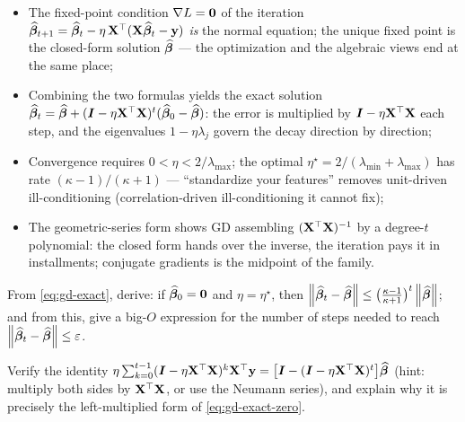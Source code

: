 \begin{keybox}
\begin{itemize}
  \item The fixed-point condition $\nabla L = \mathbf{0}$ of the iteration $\widehat{\bm{\beta}}_{t+1} = \widehat{\bm{\beta}}_t - \eta\,\mathbf{X}^\top(\mathbf{X}\widehat{\bm{\beta}}_t - \mathbf{y})$ \emph{is} the normal equation; the unique fixed point is the closed-form solution $\widehat{\bm{\beta}}$ — the optimization and the algebraic views end at the same place;
  \item Combining the two formulas yields the exact solution $\widehat{\bm{\beta}}_t = \widehat{\bm{\beta}} + (\bm{I} - \eta\mathbf{X}^\top\mathbf{X})^t(\widehat{\bm{\beta}}_0 - \widehat{\bm{\beta}})$: the error is multiplied by $\bm{I} - \eta\mathbf{X}^\top\mathbf{X}$ each step, and the eigenvalues $1 - \eta\lambda_j$ govern the decay direction by direction;
  \item Convergence requires $0 < \eta < 2/\lambda_{\max}$; the optimal $\eta^\star = 2/(\lambda_{\min} + \lambda_{\max})$ has rate $(\kappa - 1)/(\kappa + 1)$ — ``standardize your features'' removes unit-driven ill-conditioning (correlation-driven ill-conditioning it cannot fix);
  \item The geometric-series form shows GD assembling $(\mathbf{X}^\top\mathbf{X})^{-1}$ by a degree-$t$ polynomial: the closed form hands over the inverse, the iteration pays it in installments; conjugate gradients is the midpoint of the family.
\end{itemize}
\end{keybox}

\begin{exercise}\label{ex:gd-rate}
From \eqref{eq:gd-exact}, derive: if $\widehat{\bm{\beta}}_0 = \mathbf{0}$ and $\eta = \eta^\star$, then $\left\lVert \widehat{\bm{\beta}}_t - \widehat{\bm{\beta}} \right\rVert \le \big(\frac{\kappa-1}{\kappa+1}\big)^t \left\lVert \widehat{\bm{\beta}} \right\rVert$; and from this, give a big-$O$ expression for the number of steps needed to reach $\left\lVert \widehat{\bm{\beta}}_t - \widehat{\bm{\beta}} \right\rVert \le \varepsilon$.
\end{exercise}

\begin{exercise}\label{ex:neumann}
Verify the identity $\eta\sum_{k=0}^{t-1}(\bm{I} - \eta\mathbf{X}^\top\mathbf{X})^k \mathbf{X}^\top\mathbf{y} = \big[\bm{I} - (\bm{I} - \eta\mathbf{X}^\top\mathbf{X})^t\big]\widehat{\bm{\beta}}$ (hint: multiply both sides by $\mathbf{X}^\top\mathbf{X}$, or use the Neumann series), and explain why it is precisely the left-multiplied form of \eqref{eq:gd-exact-zero}.
\end{exercise}
